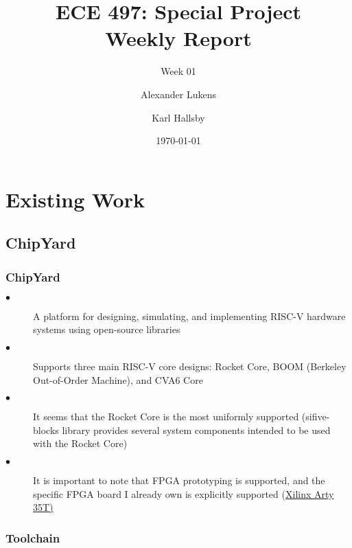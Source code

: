 \documentclass{weeklyslides}
\title[Weekly Report]{ECE 497: Special Project \\ Weekly Report}
\subtitle{Week 01}
\author{Alexander Lukens \and Karl Hallsby}
\institute{Illinois Institute of Technology}
\date{\today}
\begin{document}
\begin{frame}
  \titlepage{}
\end{frame}

\section{Existing Work}\label{sec:Existing Work}
\subsection{ChipYard}\label{subsec:ChipYard}
\begin{frame}
  \frametitle{ChipYard}
  \begin{description}
  	\item[$\bullet$] A platform for designing, simulating, and implementing RISC-V hardware systems using open-source libraries 
  	\item[$\bullet$] Supports three main RISC-V core designs: Rocket Core, BOOM (Berkeley Out-of-Order Machine), and CVA6 Core  
  	\item[$\bullet$] It seems that the Rocket Core is the most uniformly supported (sifive-blocks library provides several system components intended to be used with the Rocket Core)
  	\item[$\bullet$] It is important to note that FPGA prototyping is supported, and the specific FPGA board I already own is explicitly supported (\href{https://www.xilinx.com/products/boards-and-kits/arty.html}{Xilinx Arty 35T)}
  \end{description}
  
\end{frame}

\subsubsection{Toolchain}\label{subsubsec:Toolchain} %
\begin{frame}
  \frametitle{}
\end{frame}
\end{document}
